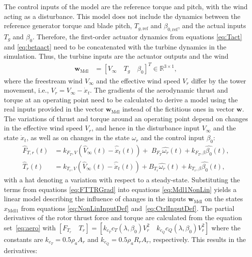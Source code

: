 The control inputs of the model are the reference torque and pitch, with the wind acting as a disturbance. This model does not include the dynamics between the reference generator torque and blade pitch, $T_{g,\text{ref}}$ and $\beta_{0,\text{ref}}$, and the actual inputs $T_{g}$ and $\beta_{0}$. Therefore, the first-order actuator dynamics from equations \eqref{eq:Tact} and \eqref{eq:betaact} need to be concatenated with the turbine dynamics in the simulation. Thus, the turbine inputs are the actuator outputs and the wind 
\begin{align} \label{eq:CtrlInputDef}
    \bm{w}_{\text{Mdl}} &= [ V_{\infty} \quad T_{g} \quad \beta_{0}]^T \in \mathbb{R}^{3 \times 1},
\end{align}
where the freestream wind $V_{\infty}$ and the effective wind speed $V_r$ differ by the tower movement, i.e., $V_r = V_{\infty} - \dot{x}_t$.
The gradients of the aerodynamic thrust and torque at an operating point need to be calculated to derive a model using the real inputs provided in the vector $\bm{w}_{\text{Mdl}}$ instead of the fictitious ones in vector $\bm{w}$. The variations of thrust and torque around an operating point depend on changes in the effective wind speed $V_r$, and hence in the disturbance input $V_{\infty}$ and the state $\dot{x}_t$, as well as on changes in the state $\omega_r$ and the control input $\beta_{0}$:
\begin{equation} \label{eq:FTTRGrad}
    \begin{split}
        \hat{F}_{T,r}(t) &= k_{F_T,V} \left( \hat{V}_{\infty}(t) - \hat{\dot{x}}_{t}(t)\right) + \; B_{F_T} \hat{\omega_r}(t) +  k_{F_T,\beta} \hat{\beta_0}(t), \\
        \hat{T}_r(t) &= k_{T_r,V} \left( \hat{V}_{\infty}(t) - \hat{\dot{x}}_{t}(t)\right) + B_{T_r} \hat{\omega_r}(t) + k_{T_r,\beta} \hat{\beta_0}(t),
    \end{split}
\end{equation} \enlargethispage{\baselineskip}
with a hat denoting a variation with respect to a steady-state. Substituting the terms from equations \eqref{eq:FTTRGrad} into equations \eqref{eq:Mdl1NonLin} yields a linear model describing the influence of changes in the inputs $\bm{w}_{\text{Mdl}}$ on the states $x_{\text{Mdl1}}$ from equations \eqref{eq:NonLinInputDef} and~\eqref{eq:CtrlInputDef}. The partial derivatives of the rotor thrust force and torque are calculated from the equation set~\eqref{eq:aero} with $[F_{T_r} \quad T_r] = [k_{c_T} c_T(\lambda,\beta_0) V_r^2 \quad k_{c_Q}  c_Q(\lambda,\beta_0) V_r^2]$ where the constants are $k_{c_T} = 0.5 \rho_a A_r$ and $k_{c_Q} = 0.5 \rho_a R_r A_r$, respectively. This results in the derivatives: 
